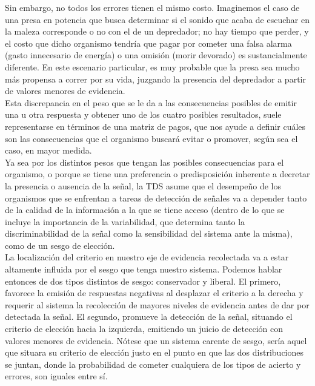 Sin embargo, no todos los errores tienen el mismo costo. Imaginemos el caso de una presa en potencia que busca determinar si el sonido que acaba de escuchar en la maleza corresponde o no con el de un depredador; no hay tiempo que perder, y el costo que dicho organismo tendría que pagar por cometer una falsa alarma (gasto innecesario de energía) o una omisión (morir devorado) es sustancialmente diferente. En este escenario particular, es muy probable que la presa sea mucho más propensa a correr por su vida, juzgando la presencia del depredador a partir de valores menores de evidencia.\\

Esta discrepancia en el peso que se le da a las consecuencias posibles de emitir una u otra respuesta y obtener uno de los cuatro posibles resultados, suele representarse en términos de una matriz de pagos, que nos ayude a definir cuáles son las consecuencias que el organismo buscará evitar o promover, según sea el caso, en mayor medida.\\

Ya sea por los distintos pesos que tengan las posibles consecuencias para el organismo, o porque se tiene una preferencia o predisposición inherente a decretar la presencia o ausencia de la señal, la TDS asume que el desempeño de los organismos que se enfrentan a tareas de detección de señales va a depender tanto de la calidad de la información a la que se tiene acceso (dentro de lo que se incluye la importancia de la variabilidad, que determina tanto la discriminabilidad de la señal como la sensibilidad del sistema ante la misma), como de un sesgo de elección.\\

La localización del criterio en nuestro eje de evidencia recolectada va a estar altamente influida por el sesgo que tenga nuestro sistema. Podemos hablar entonces de dos tipos distintos de sesgo: conservador y liberal. El primero, favorece la emisión de respuestas negativas al desplazar el criterio a la derecha y requerir al sistema la recolección de mayores niveles de evidencia antes de dar por detectada la señal. El segundo, promueve la detección de la señal, situando el criterio de elección hacia la izquierda, emitiendo un juicio de detección con valores menores de evidencia. Nótese que un sistema carente de sesgo, sería aquel que situara su criterio de elección justo en el punto en que las dos distribuciones se juntan, donde la probabilidad de cometer cualquiera de los tipos de acierto y errores, son iguales entre sí.\\


